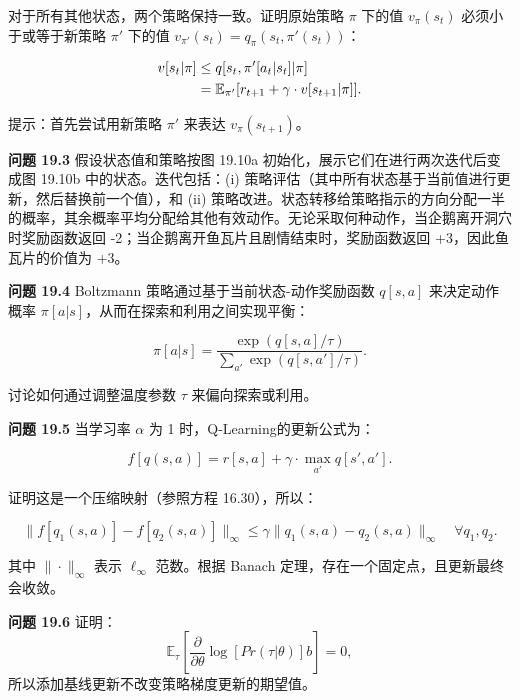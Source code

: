 \documentclass[lang=cn,newtx,10pt,scheme=chinese]{elegantbook}
\begin{document}
对于所有其他状态，两个策略保持一致。证明原始策略 \(\pi\) 下的值 \(v_{\pi}(s_t)\) 必须小于或等于新策略 \(\pi'\) 下的值 \(v_{\pi'}(s_t) = q_{\pi}(s_t, \pi'(s_t))\)：


\begin{align}
v[s_t | \pi] &\leq q[s_t, \pi'[a_t|s_t] | \pi] \notag\\
&= \mathbb{E}_{\pi'}[r_{t+1} + \gamma \cdot v[s_{t+1} | \pi]]. 
\end{align} 


提示：首先尝试用新策略 \(\pi'\) 来表达 \(v_{\pi}(s_{t+1})\)。

\textbf{问题 19.3} 假设状态值和策略按图 19.10a 初始化，展示它们在进行两次迭代后变成图 19.10b 中的状态。迭代包括：(i) 策略评估（其中所有状态基于当前值进行更新，然后替换前一个值），和 (ii) 策略改进。状态转移给策略指示的方向分配一半的概率，其余概率平均分配给其他有效动作。无论采取何种动作，当企鹅离开洞穴时奖励函数返回 -2；当企鹅离开鱼瓦片且剧情结束时，奖励函数返回 +3，因此鱼瓦片的价值为 +3。

\textbf{问题 19.4} Boltzmann 策略通过基于当前状态-动作奖励函数 \(q[s, a]\) 来决定动作概率 \(\pi[a|s]\)，从而在探索和利用之间实现平衡：

\begin{equation}
\pi[a|s] = \frac{\exp(q[s, a]/\tau)}{\sum_{a'} \exp(q[s, a']/\tau)}. 
\end{equation}

讨论如何通过调整温度参数 \(\tau\) 来偏向探索或利用。

\textbf{问题 19.5} 当学习率 \(\alpha\) 为 1 时，Q-Learning的更新公式为：

\begin{equation}
f[q(s, a)] = r[s, a] + \gamma \cdot \max_{a'} q[s', a']. 
\end{equation}

证明这是一个压缩映射（参照方程 16.30），所以：

\begin{equation}
\| f[q_1(s, a)] - f[q_2(s, a)] \|_{\infty} \leq \gamma \| q_1(s, a) - q_2(s, a) \|_{\infty} \quad \forall q_1, q_2. 
\end{equation}

其中 \(\| \cdot \|_{\infty}\) 表示 \(\ell_{\infty}\) 范数。根据 Banach 定理，存在一个固定点，且更新最终会收敛。

\textbf{问题 19.6} 证明：
\begin{equation}
\mathbb{E}_\tau \left[ \frac{\partial}{\partial \theta} \log[Pr(\tau|\theta)]b \right] = 0, 
\end{equation}
所以添加基线更新不改变策略梯度更新的期望值。
\end{document}
